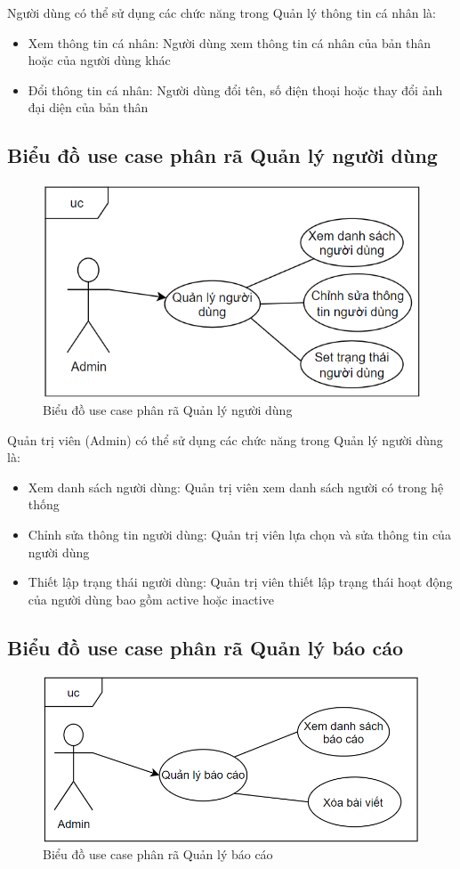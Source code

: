 \documentclass[../DoAn.tex]{subfiles}
\begin{document}
Người dùng có thể sử dụng các chức năng trong Quản lý thông tin cá nhân là:

\begin{itemize}
\item Xem thông tin cá nhân: Người dùng xem thông tin cá nhân của bản thân hoặc của người dùng khác
\item Đổi thông tin cá nhân: Người dùng đổi  tên, số điện thoại hoặc thay đổi ảnh đại diện của bản thân 
\end{itemize}

\subsection{Biểu đồ use case phân rã Quản lý người dùng}
\label{subsection:2.2.4}
\begin{figure}[H]
\includegraphics[width=0.75\linewidth]{Hinhve/userManage.png}
\centering
\caption{Biểu đồ use case phân rã Quản lý người dùng}
\end{figure}

Quản trị viên (Admin) có thể sử dụng các chức năng trong Quản lý người dùng là:

\begin{itemize}
\item Xem danh sách người dùng: Quản trị viên xem danh sách người có trong hệ thống
\item Chỉnh sửa thông tin người dùng: Quản trị viên lựa chọn và sửa thông tin của người dùng 
\item Thiết lập trạng thái người dùng: Quản trị viên thiết lập trạng thái hoạt động của người dùng
bao gồm active hoặc inactive
\end{itemize}

\subsection{Biểu đồ use case phân rã Quản lý báo cáo}
\label{subsection:2.2.5}
\begin{figure}[H]
\includegraphics[width=0.75\linewidth]{Hinhve/ReportManage.png}
\centering
\caption{Biểu đồ use case phân rã Quản lý báo cáo}
\end{figure}
\end{document}
